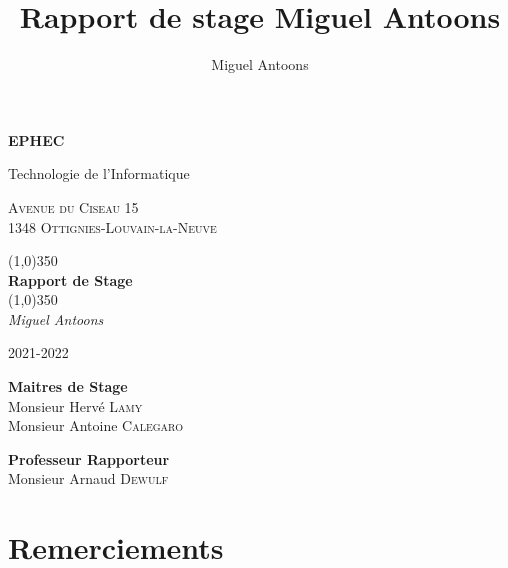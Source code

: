 \documentclass[11pt]{article}
\title{Rapport de stage Miguel Antoons}
\author{Miguel Antoons}
\begin{document}
\begin{titlepage}
    \begin{center}
        \LARGE
        \textbf{EPHEC}

        \vspace{0.1cm}
        \LARGE
        Technologie de l'Informatique

        \large
        \vspace{1.5cm}
        \textsc{Avenue du Ciseau 15}\\
        \textsc{1348 Ottignies-Louvain-la-Neuve}


        \line(1,0){350}\\
        \Huge
        \textbf{Rapport de Stage}\\
        \line(1,0){350}\\

        \vspace{0.5cm}
        \Large
        \textit{Miguel Antoons}

        \vspace{0.5cm}
        \large
        2021-2022

        \vspace{2.5cm}
        \large
        \textbf{Maitres de Stage}
        \vspace{0.2cm}\\
        Monsieur Hervé \textsc{Lamy}\\
        Monsieur Antoine \textsc{Calegaro}

        \vspace{2.5cm}
        \large
        \textbf{Professeur Rapporteur}
        \vspace{0.2cm}\\
        Monsieur Arnaud \textsc{Dewulf}


    \end{center}
\end{titlepage}

\tableofcontents

\newpage

\section{Remerciements}
\end{document}
